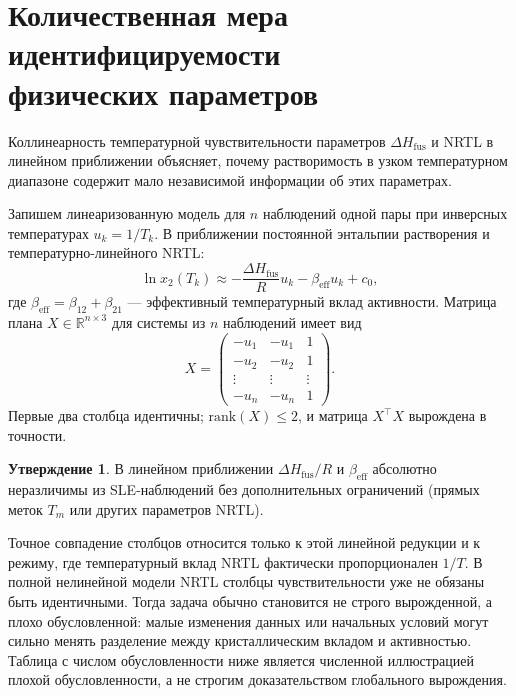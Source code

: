 \documentclass[11pt]{article}
\newcommand{\dHfus}{\Delta H_{\mathrm{fus}}}
\theoremstyle{definition}
\newtheorem{claim}{Утверждение}[section]
\begin{document}
\section[Количественная мера идентифицируемости физических параметров]{Количественная мера идентифицируемости\\физических параметров}
\label{app:identifiability-quantitative}

Коллинеарность температурной чувствительности параметров $\Delta H_{\mathrm{fus}}$ и NRTL в линейном приближении объясняет, почему растворимость в узком температурном диапазоне содержит мало независимой информации об этих параметрах.

Запишем линеаризованную модель для $n$ наблюдений одной пары при инверсных температурах $u_k = 1/T_k$. В приближении постоянной энтальпии растворения и температурно-линейного NRTL:
\begin{equation}
    \ln x_2(T_k) \approx -\frac{\dHfus}{R} u_k - \beta_{\mathrm{eff}} u_k + c_0,
\end{equation}
где $\beta_{\mathrm{eff}} = \beta_{12} + \beta_{21}$ — эффективный температурный вклад активности. Матрица плана $X \in \mathbb R^{n \times 3}$ для системы из $n$ наблюдений имеет вид
\begin{equation*}
    X = \begin{pmatrix} -u_1 & -u_1 & 1 \\ -u_2 & -u_2 & 1 \\ \vdots & \vdots & \vdots \\ -u_n & -u_n & 1 \end{pmatrix}.
\end{equation*}
Первые два столбца идентичны; $\mathrm{rank}(X) \le 2$, и матрица $X^\top X$ вырождена в точности.

\begin{claim}
В линейном приближении $\dHfus/R$ и $\beta_{\mathrm{eff}}$ абсолютно неразличимы из SLE-наблюдений без дополнительных ограничений (прямых меток $T_m$ или других параметров NRTL).
\end{claim}

Точное совпадение столбцов относится только к этой линейной редукции и к режиму, где температурный вклад NRTL фактически пропорционален $1/T$. В полной нелинейной модели NRTL столбцы чувствительности уже не обязаны быть идентичными. Тогда задача обычно становится не строго вырожденной, а плохо обусловленной: малые изменения данных или начальных условий могут сильно менять разделение между кристаллическим вкладом и активностью. Таблица с числом обусловленности ниже является численной иллюстрацией плохой обусловленности, а не строгим доказательством глобального вырождения.
\end{document}
